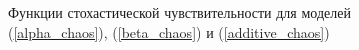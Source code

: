     \begin{figure}
        \centering
        
            
        \caption{Функции стохастической чувствительности для моделей (\ref{alpha_chaos}), (\ref{beta_chaos}) и (\ref{additive_chaos})}
    \end{figure}
